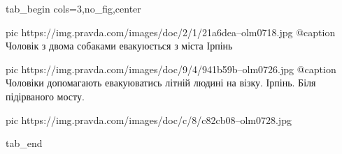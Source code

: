  
 
 
 
 


\ifcmt
  tab_begin cols=3,no_fig,center

     pic https://img.pravda.com/images/doc/2/1/21a6dea--olm0718.jpg
		 @caption Чоловік з двома собаками евакуюється з міста Ірпінь

		 pic https://img.pravda.com/images/doc/9/4/941b59b--olm0726.jpg
		 @caption Чоловіки допомагають евакуюватись літній людині на візку. Ірпінь. Біля підірваного мосту.

		 pic https://img.pravda.com/images/doc/c/8/c82cb08--olm0728.jpg

  tab_end
\fi

